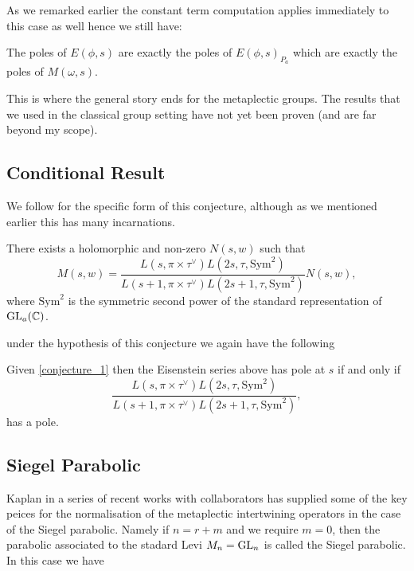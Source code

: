    As we remarked earlier the constant term computation applies immediately to this case as well hence we still have:
    \begin{Lemma}
            The poles of \(E(\phi, s)\) are exactly the poles of \(E(\phi,s)_{P_a}\) which are exactly the poles of \(M(\omega, s)\).
    \end{Lemma}
    This is where the general story ends for the metaplectic groups. The results that we used in the classical group setting have not yet been proven (and are far beyond my scope). 

    \subsection{Conditional Result}
     We follow \cite[Assumption 6.1]{wuThetaCorrespondenceSimple2024wuThetaCorrespondenceSimple2024} for the specific form of this conjecture, although as we mentioned earlier  this has many incarnations. 
     \begin{Conj}\label{conjecture_1}
        There exists a holomorphic and non-zero \(N(s,w)\) such that 
     \[M(s, w) = \frac{L(s, \pi\times \tau^{\vee}) L(2s, \tau, \mathrm{Sym}^2)}{L(s+1, \pi\times \tau^\vee)L(2s+1, \tau, \mathrm{Sym}^2)}N(s,w),\]
     where \(\mathrm{Sym}^2\) is the symmetric second power of the standard representation of \(\GL_a(\C)\).
     \end{Conj}

     under the hypothesis of this conjecture we again have the following
     \begin{Lemma}
        Given \ref{conjecture_1} then the Eisenstein series above has pole at \(s\) if and only if 
        \[\frac{L(s, \pi\times \tau^{\vee}) L(2s, \tau, \mathrm{Sym}^2)}{L(s+1, \pi\times \tau^\vee)L(2s+1, \tau, \mathrm{Sym}^2)},\]
        has a pole.
     \end{Lemma}


    \subsection{Siegel Parabolic}


    Kaplan in a series of recent works with collaborators \cite{kaplanDoublingConstructionsComplete2021a}\cite{kaplanDoublingConstructionsTensor2020}\cite{caiDoublingConstructionsGlobal2024} has supplied some of the key peices for the normalisation of the metaplectic intertwining operators in the case of the Siegel parabolic. Namely if \(n = r+ m\) and we require \(m=0\), then the parabolic associated to the stadard Levi \(M_n = \operatorname{GL}_n\) is called the Siegel parabolic. In this case we have

